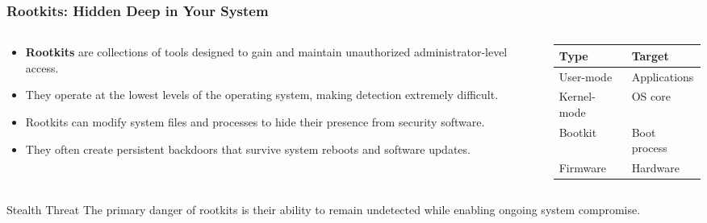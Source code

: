\documentclass{beamer}
\begin{document}
\begin{frame}
    \frametitle{Rootkits: Hidden Deep in Your System}
    
    \begin{columns}
        \begin{column}{0.6\textwidth}
            \begin{itemize}
                \item \textbf{Rootkits} are collections of tools designed to gain and maintain unauthorized administrator-level access.
                \item They operate at the lowest levels of the operating system, making detection extremely difficult.
                \item Rootkits can modify system files and processes to hide their presence from security software.
                \item They often create persistent backdoors that survive system reboots and software updates.
            \end{itemize}
        \end{column}
        \begin{column}{0.4\textwidth}
            \begin{table}
                \centering
                \small
                \begin{tabular}{l|l}
                    \textbf{Type} & \textbf{Target} \\
                    \hline
                    User-mode & Applications \\
                    Kernel-mode & OS core \\
                    Bootkit & Boot process \\
                    Firmware & Hardware \\
                \end{tabular}
            \end{table}
        \end{column}
    \end{columns}
    
    \begin{alertblock}{Stealth Threat}
        The primary danger of rootkits is their ability to remain undetected while enabling ongoing system compromise.
    \end{alertblock}
\end{frame}
\end{document}
